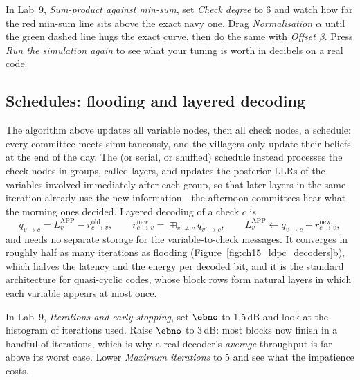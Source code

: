 \begin{tryit}
In Lab~9, \emph{Sum-product against min-sum}, set \emph{Check degree} to 6 and watch how far the
red min-sum line sits above the exact navy one. Drag \emph{Normalisation $\alpha$} until the green
dashed line hugs the exact curve, then do the same with \emph{Offset $\beta$}. Press \emph{Run the
simulation again} to see what your tuning is worth in decibels on a real code.
\end{tryit}

\subsection{Schedules: flooding and layered decoding}

The algorithm above updates all variable nodes, then all check nodes, a  schedule:
every committee meets simultaneously, and the villagers only update their beliefs at the end of
the day. The  (or serial, or shuffled) schedule instead processes the check nodes in
groups, called layers, and updates the posterior LLRs of the variables involved immediately after
each group, so that later layers in the same iteration already use the new information---the
afternoon committees hear what the morning ones decided. Layered decoding of a check $c$ is
\begin{equation}
q_{v\to c}=L^{\text{APP}}_v-r^{\text{old}}_{c\to v},\qquad
r^{\text{new}}_{c\to v}=\mathop{\boxplus}_{v'\ne v}q_{v'\to c},\qquad
L^{\text{APP}}_v\leftarrow q_{v\to c}+r^{\text{new}}_{c\to v},
\end{equation}
and needs no separate storage for the variable-to-check messages. It converges in roughly half as
many iterations as flooding (Figure~\ref{fig:ch15_ldpc_decoders}b), which halves the latency and
the energy per decoded bit, and it is the standard architecture for quasi-cyclic codes, whose block
rows form natural layers in which each variable appears at most once.


\begin{tryit}
In Lab~9, \emph{Iterations and early stopping}, set $\ebno$ to 1.5\,dB and look at the histogram
of iterations used. Raise $\ebno$ to 3\,dB: most blocks now finish in a handful of iterations,
which is why a real decoder's \emph{average} throughput is far above its worst case. Lower
\emph{Maximum iterations} to 5 and see what the impatience costs.
\end{tryit}

